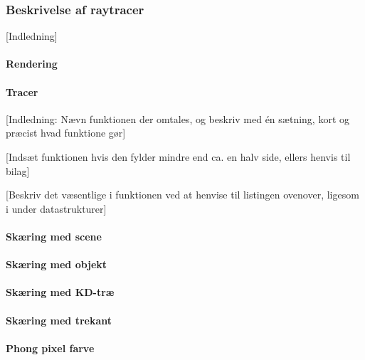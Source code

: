 \subsubsection{Beskrivelse af raytracer}
[Indledning]
\paragraph{Rendering}

\paragraph{Tracer}
[Indledning: Nævn funktionen der omtales, og beskriv med én sætning, kort og præcist hvad funktione gør]

[Indsæt funktionen hvis den fylder mindre end ca. en halv side, ellers henvis til bilag]

[Beskriv det væsentlige i funktionen ved at henvise til listingen ovenover, ligesom i under datastrukturer]
 
\paragraph{Skæring med scene}

\paragraph{Skæring med objekt}

\paragraph{Skæring med KD-træ}

\paragraph{Skæring med trekant}

\paragraph{Phong pixel farve}



